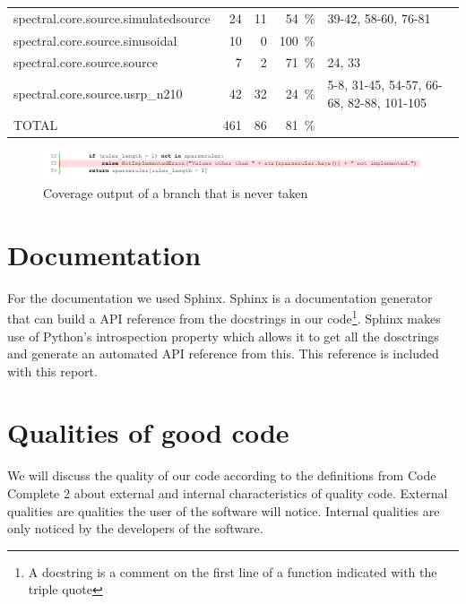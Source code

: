 \documentclass[a4paper, openany, oneside]{memoir}
\begin{document}
\begin{table}
{\begin{tabular}{l r r r p{4cm}}
spectral.core.source.simulatedsource        &    24  &   11  &\SI{54}{\percent} &  39-42, 58-60, 76-81 \\
spectral.core.source.sinusoidal             &    10  &    0  &\SI{100}{\percent}& \\
spectral.core.source.source                 &     7  &    2  &\SI{71}{\percent} &  24, 33 \\
spectral.core.source.usrp\_n210              &    42  &   32  &\SI{24}{\percent} &  5-8, 31-45, 54-57, 66-68, 82-88, 101-105 \\
\midrule
TOTAL                                       &   461  &   86  &\SI{81}{\percent} & \\
\bottomrule
\end{tabular}}
\label{tbl:coverage}
\end{table}


\begin{figure}[h]
    \centering
    \includegraphics[width=\textwidth]{fig_branch_coverage.pdf}
    \caption{Coverage output of a branch that is never taken}
    \label{fig:coverage_branch}
\end{figure}

\section{Documentation}
\label{sec:documentation}
For the documentation we used Sphinx. Sphinx is a documentation generator that can build a API reference from the docstrings in our code\footnote{A docstring is a comment on the first line of a function indicated with the triple quote}. Sphinx makes use of Python's introspection property which allows it to get all the dosctrings and generate an automated API reference from this. This reference is included with this report.

\section{Qualities of good code}
We will discuss the quality of our code according to the definitions from Code Complete 2 about external and internal characteristics of quality code. External qualities are qualities the user of the software will notice. Internal qualities are only noticed by the developers of the software.\cite{mcconnell2004code}
\end{document}
